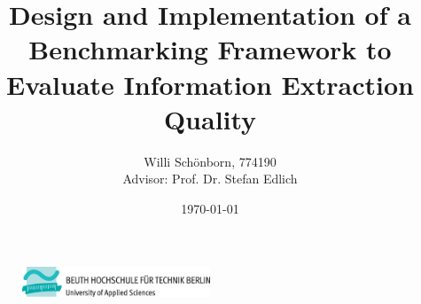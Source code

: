 \documentclass[a4paper,12pt]{article}
\title{Design and Implementation of a \\ Benchmarking Framework to \\ Evaluate Information Extraction Quality}
\author{Willi Schönborn, 774190 \\ Advisor: Prof. Dr. Stefan Edlich}
\date{\today}
\begin{document}
\begin{figure}[H]
\centering
\includegraphics[width=0.5\textwidth]{beuth.eps}
\maketitle
\end{figure}



\nocite{*}
\printbibliography
\end{document}
